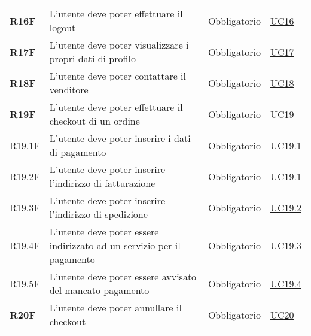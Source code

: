 \begin{center}
\begin{longtable}[!h]{p{50px} p{245px} p{75px} p{50px}}
        \textbf{R16F}                         & L'utente deve poter effettuare il logout                                                                   & Obbligatorio             & \hyperref[sec:UC16]{UC16}                    \\
        \textbf{R17F}                         & L'utente deve poter visualizzare i propri dati di profilo                                                  & Obbligatorio             & \hyperref[sec:UC17]{UC17}                    \\
        \textbf{R18F}                         & L'utente deve poter contattare il venditore                                                                & Obbligatorio             & \hyperref[sec:UC18]{UC18}                    \\
        \textbf{R19F}                         & L'utente deve poter effettuare il checkout di un ordine                                                    & Obbligatorio             & \hyperref[sec:UC19]{UC19}                    \\
        R19.1F                                & L'utente deve poter inserire i dati di pagamento                                                           & Obbligatorio             & \hyperref[sec:UC19.1]{UC19.1}                \\
        R19.2F                                & L'utente deve poter inserire l'indirizzo di fatturazione                                                   & Obbligatorio             & \hyperref[sec:UC19.1]{UC19.1}                \\
        R19.3F                                & L'utente deve poter inserire l'indirizzo di spedizione                                                     & Obbligatorio             & \hyperref[sec:UC19.2]{UC19.2}                \\
        R19.4F                                & L'utente deve poter essere indirizzato ad un servizio per il pagamento                                     & Obbligatorio             & \hyperref[sec:UC19.3]{UC19.3}                \\
        R19.5F                                & L'utente deve poter essere avvisato del mancato pagamento                                                  & Obbligatorio             & \hyperref[sec:UC19.4]{UC19.4}                \\
        \textbf{R20F}                         & L'utente deve poter annullare il checkout                                                                  & Obbligatorio             & \hyperref[sec:UC20]{UC20}                    \\

\end{longtable}
\end{center}
